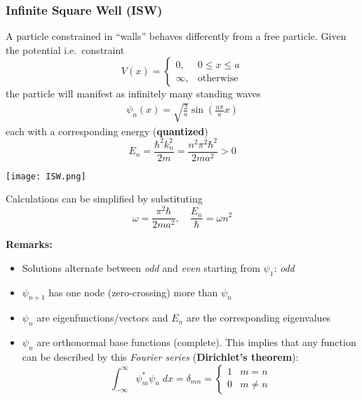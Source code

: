 \subsubsection{Infinite Square Well (ISW)}\label{ssec:ISW}
A particle constrained in ``walls'' behaves differently from a free particle. Given the potential i.e.\ constraint
\noindent\begin{equation*}
    V(x)=\begin{cases}0,&0\le x\le a\\\infty,&\text{otherwise}\end{cases}
\end{equation*}
the particle will manifest as infinitely many standing waves
\noindent\begin{align*}
    \psi_{n}(x)=\sqrt{\frac{2}{a}}\sin\left(\frac{n\pi}{a}x\right)
\end{align*}
each with a corresponding energy (\textbf{quantized})
\noindent\begin{equation*}
    E_{n}=\frac{\hbar^{2}k_{n}^{2}}{2m}=\frac{n^{2}\pi^{2}\hbar^{2}}{2ma^{2}} > 0
\end{equation*}

\begin{center}
    \texttt{[image: ISW.png]}
\end{center}
Calculations can be simplified by substituting
\begin{equation*}
    \omega= \frac{\pi^2 \hbar}{2m a^2},\quad \frac{E_n}{\hbar} = \omega n^2
\end{equation*}

\textbf{Remarks:}
\begin{itemize}
    \item Solutions alternate between \textit{odd} and \textit{even} starting from $\psi_1$: \textit{odd}
    \item $\psi_{n+1}$ has one node (zero-crossing) more than $\psi_n$
    \item $\psi_n$ are eigenfunctions/vectors and $E_n$ are the corresponding eigenvalues
    \item $\psi_n$ are orthonormal base functions (complete). This implies that any function can be  described by this \textit{Fourier series} (\textbf{Dirichlet's theorem}):
          \noindent\begin{equation*}
              \int_{-\infty}^{\infty} \psi_m^*\psi_n\; dx = \delta_{mn}= \begin{cases}
                  1 & m=n     \\
                  0 & m\neq n
              \end{cases}
          \end{equation*}
\end{itemize}

